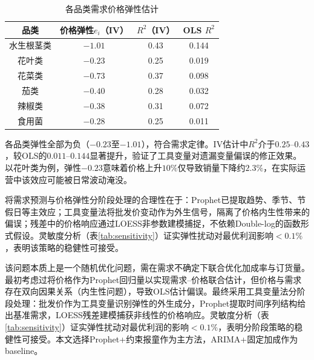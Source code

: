 \begin{table}[H]
  \centering
  \caption{各品类需求价格弹性估计}
  \label{tab:elasticity}
  \begin{tabularx}{\textwidth}{CCCC}
    \toprule
    品类 & 价格弹性$e_i$（IV） & $R^2$（IV） & OLS $R^2$ \\
    \midrule
    水生根茎类 & $-1.01$ & 0.43 & 0.144 \\
    花叶类 & $-0.23$ & 0.25 & 0.019 \\
    花菜类 & $-0.73$ & 0.37 & 0.098 \\
    茄类 & $-0.40$ & 0.28 & 0.032 \\
    辣椒类 & $-0.38$ & 0.31 & 0.072 \\
    食用菌 & $-0.28$ & 0.25 & 0.011 \\
    \bottomrule
  \end{tabularx}
\end{table}

各品类弹性全部为负（$-0.23$至$-1.01$），符合需求定律。IV估计中$R^2$介于$0.25$--$0.43$，较OLS的$0.011$--$0.144$显著提升，验证了工具变量对遗漏变量偏误的修正效果。以花叶类为例，弹性$-0.23$意味着价格上升$10\%$仅导致销量下降约$2.3\%$，在实际运营中该效应可能被日常波动淹没。

将需求预测与价格弹性分阶段处理的合理性在于：Prophet已提取趋势、季节、节假日等主效应；工具变量法将批发价变动作为外生信号，隔离了价格内生性带来的偏误；残差中的价格响应通过LOESS非参数建模捕捉，不依赖Double-log的函数形式假设。灵敏度分析（表\ref{tab:sensitivity}）证实弹性扰动对最优利润影响$<0.1\%$，表明该策略的稳健性可接受。

该问题本质上是一个随机优化问题，需在需求不确定下联合优化加成率与订货量。最初考虑过将价格作为Prophet回归量以实现需求--价格联合估计，但价格与需求存在双向因果关系（内生性问题），导致OLS估计偏误。最终采用工具变量法分阶段处理：批发价作为工具变量识别弹性的外生成分，Prophet提取时间序列结构给出基准需求，LOESS残差建模捕获非线性的价格响应。灵敏度分析（表\ref{tab:sensitivity}）证实弹性扰动对最优利润的影响$<0.1\%$，表明分阶段策略的稳健性可接受。本文选择Prophet+约束报童作为主方法，ARIMA+固定加成作为baseline。
